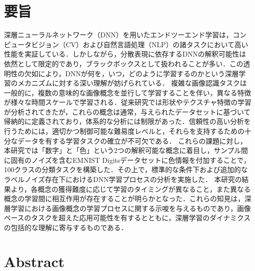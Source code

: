 \chapter*{要旨}
深層ニューラルネットワーク（DNN）を用いたエンドツーエンド学習は，コンピュータビジョン（CV）および自然言語処理（NLP）の諸タスクにおいて高い性能を実証している．しかしながら，分散表現に依存するDNNの解釈可能性は依然として限定的であり，ブラックボックスとして扱われることが多い．この透明性の欠如により，DNNが何を，いつ，どのように学習するのかという深層学習のメカニズムに対する深い理解が妨げられている．
複雑な画像認識タスクは一般的に，複数の意味的な画像概念を並行して学習することを伴い，異なる特徴が様々な時間スケールで学習される．従来研究では形状やテクスチャ特徴の学習が分析されてきたが，これらの概念は通常，与えられたデータセットに基づいて帰納的に定義されており，体系的な分析には制限があった．信頼性の高い分析を行うためには，適切かつ制御可能な難易度レベルと，それらを支持するための十分なデータを有する学習タスクの確立が不可欠である．
これらの課題に対し，本研究では「数字」と「色」という2つの解釈可能な概念に着目し，サンプル間に固有のノイズを含むEMNIST Digitsデータセットに色情報を付加することで，100クラスの分類タスクを構築した．その上で，標準的な条件下および追加的なラベルノイズ存在下におけるDNN学習プロセスの分析を実施した．
本研究の結果より，各概念の獲得難度に応じて学習のタイミングが異なること，また異なる概念の学習間に相互作用が存在することが明らかとなった．これらの知見は，深層学習における画像概念の学習プロセスに関する示唆を与えるものであり，画像ベースのタスクを超えた応用可能性を有するとともに，深層学習のダイナミクスの包括的な理解に寄与するものである．
\newpage

\chapter*{Abstract}

